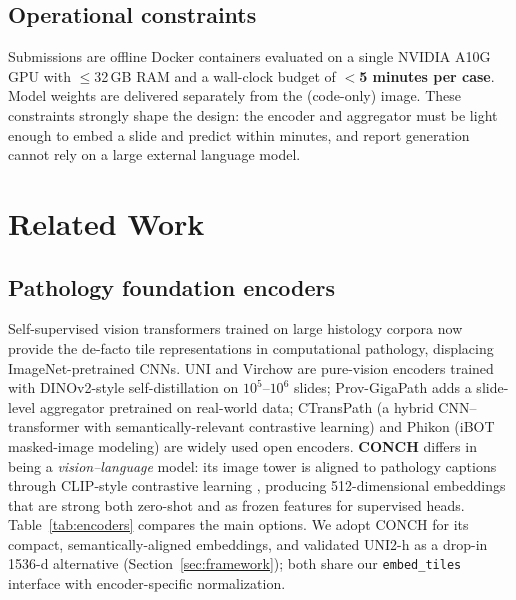 \documentclass[11pt,a4paper]{article}
\newcommand{\code}[1]{\texttt{\small #1}}
\begin{document}
\subsection{Operational constraints}
Submissions are offline Docker containers evaluated on a single NVIDIA A10G GPU with
$\le$32\,GB RAM and a wall-clock budget of \textbf{$<$5 minutes per case}. Model weights are
delivered separately from the (code-only) image. These constraints strongly shape the design:
the encoder and aggregator must be light enough to embed a slide and predict within minutes,
and report generation cannot rely on a large external language model.

\section{Related Work}
\label{sec:related}

\subsection{Pathology foundation encoders}
Self-supervised vision transformers \cite{dosovitskiy2021vit} trained on large histology
corpora now provide the de-facto tile representations in computational pathology, displacing
ImageNet-pretrained CNNs. UNI \cite{chen2024uni} and Virchow \cite{vorontsov2024virchow} are
pure-vision encoders trained with DINOv2-style self-distillation on $10^{5}$--$10^{6}$ slides;
Prov-GigaPath \cite{xu2024provgigapath} adds a slide-level aggregator pretrained on real-world
data; CTransPath \cite{wang2022ctranspath} (a hybrid CNN--transformer with semantically-relevant
contrastive learning) and Phikon \cite{filiot2023phikon} (iBOT masked-image modeling) are widely
used open encoders. \textbf{CONCH} \cite{lu2024conch} differs in being a \emph{vision--language}
model: its image tower is aligned to pathology captions through CLIP-style contrastive learning
\cite{radford2021clip}, producing 512-dimensional embeddings that are strong both zero-shot and
as frozen features for supervised heads. Table~\ref{tab:encoders} compares the main options. We
adopt CONCH for its compact, semantically-aligned embeddings, and validated UNI2-h as a drop-in
1536-d alternative (Section~\ref{sec:framework}); both share our \code{embed\_tiles} interface
with encoder-specific normalization.
\end{document}
